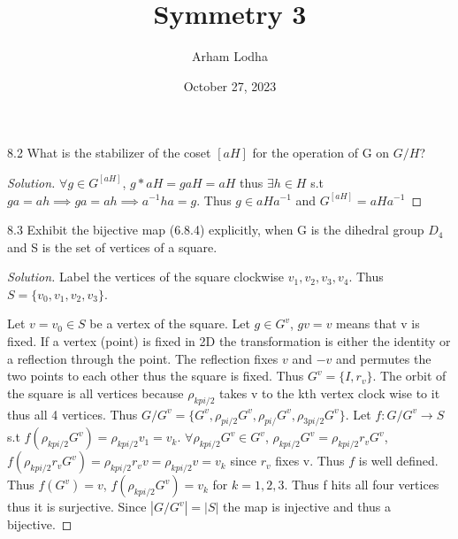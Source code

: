 \documentclass{article}
\newenvironment{solution}
{\renewcommand\qedsymbol{$\blacksquare$}\begin{proof}[Solution]}
{\end{proof}}
\begin{document}
\title{Symmetry 3}
\author{Arham Lodha}%
\date{October 27, 2023}%
\maketitle

\begin{PROB}{8.2}\label{Problem 8.2.}
    What is the stabilizer of the coset $[aH]$ for the operation of G on $G/H$?
\end{PROB}
\begin{solution}
    $\forall g \in G^{[aH]}$, $g * aH = gaH = aH$ thus $\exists h \in H$ s.t $ga = ah \implies ga = ah \implies a^{-1}ha = g$. Thus $g \in aHa^{-1}$ and $G^{[aH]} = aHa^{-1}$
\end{solution}

\bigskip

\begin{PROB}{8.3}\label{Problem 8.3.}
    Exhibit the bijective map (6.8.4) explicitly, when G is the dihedral group $D_4$ and S is the set of vertices of a square.
\end{PROB}
\begin{solution}
    Label the vertices of the square clockwise $v_1, v_2, v_3, v_4$. Thus $S = \{v_0, v_1, v_2, v_3\}$.

    Let $v = v_0 \in S$ be a vertex of the square. Let $g \in G^v$, $gv = v$ means that v is fixed. If a vertex (point) is fixed in 2D the transformation is either the identity or a reflection through the point. The reflection fixes $v$ and $-v$ and permutes the two points to each other thus the square is fixed. Thus $G^v = \{I, r_v\}$. The orbit of the square is all vertices because $\rho_{kpi/2}$ takes v to the kth vertex clock wise to it thus all 4 vertices. Thus $G/G^v = \{G^v, \rho_{pi/2}G^v, \rho_{pi/}G^v, \rho_{3pi/2}G^v\}$. Let $f: G/G^v \to S$ s.t $f(\rho_{kpi/2}G^v) = \rho_{kpi/2}v_1 = v_k$. $\forall \rho_{kpi/2}G^v \in G^v$, $\rho_{kpi/2}G^v = \rho_{kpi/2}r_v G^v$, $f(\rho_{kpi/2}r_v G^v) = \rho_{kpi/2}r_v v = \rho_{kpi/2}v = v_k$ since $r_v$ fixes v. Thus $f$ is well defined. Thus $f(G^v) = v$, $f(\rho_{kpi/2}G^v) = v_k$ for $k = 1, 2, 3$. Thus f hits all four vertices thus it is surjective. Since $|G/G^v| = |S|$ the map is injective and thus a bijective.
\end{solution}

\bigskip
\end{document}
